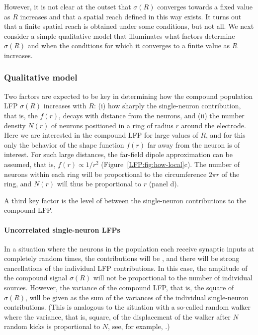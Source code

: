 However, it is not clear at the outset that $\sigma(R)$ converges towards a fixed value as $R$ increases and that
a spatial reach defined in this way exists. It turns out that a finite spatial reach is obtained under some conditions, but not all.
We next consider a simple qualitative model that illuminates what factors determine $\sigma(R)$ and when the conditions for
which it converges to a finite value as $R$ increases. 

\subsubsection{Qualitative model}

Two factors are expected to be key in determining how the compound population LFP $\sigma(R)$ increases with $R$:
(i) how sharply the single-neuron contribution, that is, the  $f(r)$, decays with distance from the neurons, and (ii) the number
density $N(r)$ of neurons positioned in a ring of radius $r$ around the electrode. Here we are interested in the compound LFP for large values of
$R$, and for this only the behavior of the shape function $f(r)$ far away from the neuron is of interest. For such large distances, the far-field dipole approximation
can be assumed, that is, $f(r) \propto 1/r^2$ (Figure~\ref{LFP:fig:how-local}c). 
The number of neurons within each ring will be proportional to the circumference $2\pi r$
of the ring, and $N(r)$ will thus be proportional to $r$ (panel d).

A third key factor is the level of  between the single-neuron contributions to the compound LFP. 

\paragraph{Uncorrelated single-neuron LFPs}
In a situation
where the neurons in the population each receive synaptic inputs at completely random times, the contributions will be , and
there will be strong cancellations of the individual LFP contributions. In this case, the amplitude of the compound signal  $\sigma(R)$ will not be proportional 
to the number of individual sources. However, the variance of the compound LFP, that is, the square of  $\sigma(R)$, will be
given as the sum of the variances of the individual single-neuron contributions. 
(This is analogous to the situation with a so-called random walker where
the variance, that is, square, of the displacement of the walker after $N$ random kicks is proportional to $N$, see, for example, \citet[Ch. X]{nelson2008}.)

